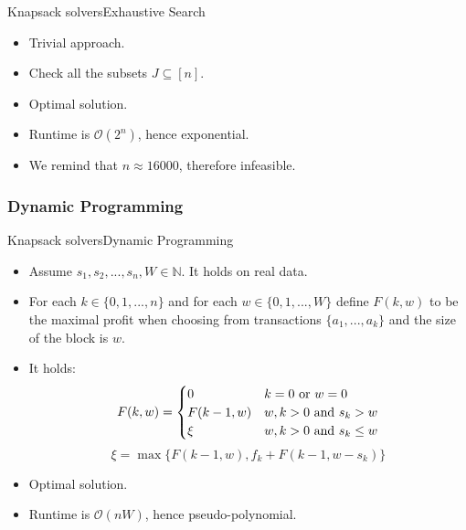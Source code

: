 \documentclass{beamer}
\begin{document}
\begin{frame}{Knapsack solvers}{Exhaustive Search}
    \begin{itemize}
        \item {Trivial approach.}
        \item {Check all the subsets $J \subseteq [n]$.}
        \item{Optimal solution.}
        \item {Runtime is $ \mathcal{O}(2^n)$, hence exponential.}
        \item {We remind that $n \approx 16000$, therefore infeasible.}
    \end{itemize}
\end{frame}
\subsubsection*{Dynamic Programming}

\begin{frame}{Knapsack solvers}{Dynamic Programming}
    \begin{itemize}
        \item {Assume $s_1,s_2,...,s_n,W \in \mathbb N$. It holds on real 
        data.}
        \item {For each $ k\in \{0,1,...,n\}$ and for each 
        $w\in \{0,1,...,W\} $ define  $F(k,w)$ to be the maximal profit when 
        choosing from transactions $\{a_1,...,a_k\}$ and the size of the 
        block is $w$.}
        \item { It holds:
            \begin{equation*}
                F(k,w) = \begin{cases}
                0 & \text{$k = 0$ or $ w = 0$}\\
                F(k-1,w) & \text{$w,k > 0$ and $s_k > w$} \\
                \xi & \text{$w,k > 0$ and $s_k \leq w$}
                \end{cases}
            \end{equation*}
            $$ \xi = \max\{F(k-1,w), f_k + F(k-1,w-s_k)\} $$
            }
        \item {Optimal solution.}
        \item {Runtime is $\mathcal{O}(nW)$, hence pseudo-polynomial.}
    \end{itemize}
\end{frame}
\end{document}
